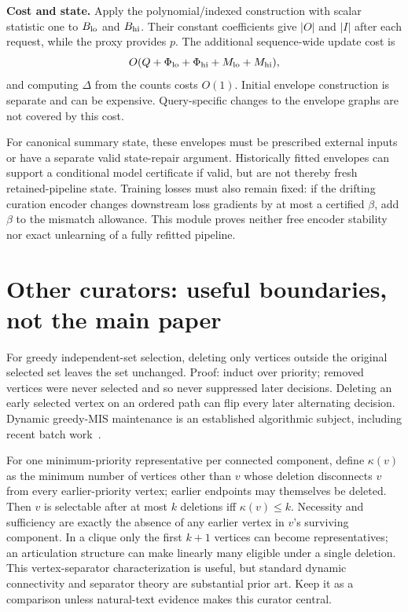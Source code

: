 \documentclass[11pt,a4paper]{article}
\theoremstyle{definition}\newtheorem{definition}[theorem]{Definition}
\begin{document}
\textbf{Cost and state.} Apply the polynomial/indexed construction with scalar statistic one to $B_{\rm lo}$ and $B_{\rm hi}$. Their constant coefficients give $|O|$ and $|I|$ after each request, while the proxy provides $p$. The additional sequence-wide update cost is
\[
 O(Q+\Phi_{\rm lo}+\Phi_{\rm hi}+M_{\rm lo}+M_{\rm hi}),
\]
and computing $\Delta$ from the counts costs $O(1)$. Initial envelope construction is separate and can be expensive. Query-specific changes to the envelope graphs are not covered by this cost.

For canonical summary state, these envelopes must be prescribed external inputs or have a separate valid state-repair argument. Historically fitted envelopes can support a conditional model certificate if valid, but are not thereby fresh retained-pipeline state. Training losses must also remain fixed: if the drifting curation encoder changes downstream loss gradients by at most a certified $\beta$, add $\beta$ to the mismatch allowance. This module proves neither free encoder stability nor exact unlearning of a fully refitted pipeline.

\section{Other curators: useful boundaries, not the main paper}
For greedy independent-set selection, deleting only vertices outside the original selected set leaves the set unchanged. Proof: induct over priority; removed vertices were never selected and so never suppressed later decisions. Deleting an early selected vertex on an ordered path can flip every later alternating decision. Dynamic greedy-MIS maintenance is an established algorithmic subject, including recent batch work~\cite{assadi2019,dhulipala2026}.

For one minimum-priority representative per connected component, define $\kappa(v)$ as the minimum number of vertices other than $v$ whose deletion disconnects $v$ from every earlier-priority vertex; earlier endpoints may themselves be deleted. Then $v$ is selectable after at most $k$ deletions iff $\kappa(v)\le k$. Necessity and sufficiency are exactly the absence of any earlier vertex in $v$'s surviving component. In a clique only the first $k+1$ vertices can become representatives; an articulation structure can make linearly many eligible under a single deletion. This vertex-separator characterization is useful, but standard dynamic connectivity and separator theory are substantial prior art. Keep it as a comparison unless natural-text evidence makes this curator central.
\end{document}
